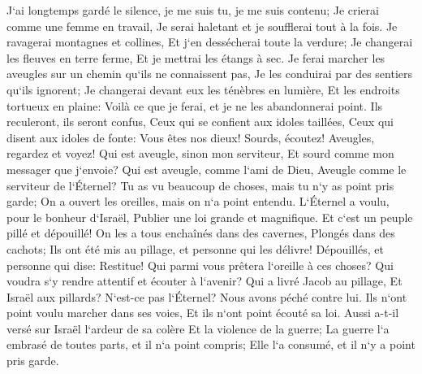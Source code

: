 \verse J`ai longtemps gardé le silence, je me suis tu, je me suis contenu; Je crierai comme une femme en travail, Je serai haletant et je soufflerai tout à la fois. 
\verse Je ravagerai montagnes et collines, Et j`en dessécherai toute la verdure; Je changerai les fleuves en terre ferme, Et je mettrai les étangs à sec. 
\verse Je ferai marcher les aveugles sur un chemin qu`ils ne connaissent pas, Je les conduirai par des sentiers qu`ils ignorent; Je changerai devant eux les ténèbres en lumière, Et les endroits tortueux en plaine: Voilà ce que je ferai, et je ne les abandonnerai point. 
\verse Ils reculeront, ils seront confus, Ceux qui se confient aux idoles taillées, Ceux qui disent aux idoles de fonte: Vous êtes nos dieux! 
\verse Sourds, écoutez! Aveugles, regardez et voyez! 
\verse Qui est aveugle, sinon mon serviteur, Et sourd comme mon messager que j`envoie? Qui est aveugle, comme l`ami de Dieu, Aveugle comme le serviteur de l`Éternel? 
\verse Tu as vu beaucoup de choses, mais tu n`y as point pris garde; On a ouvert les oreilles, mais on n`a point entendu. 
\verse L`Éternel a voulu, pour le bonheur d`Israël, Publier une loi grande et magnifique. 
\verse Et c`est un peuple pillé et dépouillé! On les a tous enchaînés dans des cavernes, Plongés dans des cachots; Ils ont été mis au pillage, et personne qui les délivre! Dépouillés, et personne qui dise: Restitue! 
\verse Qui parmi vous prêtera l`oreille à ces choses? Qui voudra s`y rendre attentif et écouter à l`avenir? 
\verse Qui a livré Jacob au pillage, Et Israël aux pillards? N`est-ce pas l`Éternel? Nous avons péché contre lui. Ils n`ont point voulu marcher dans ses voies, Et ils n`ont point écouté sa loi. 
\verse Aussi a-t-il versé sur Israël l`ardeur de sa colère Et la violence de la guerre; La guerre l`a embrasé de toutes parts, et il n`a point compris; Elle l`a consumé, et il n`y a point pris garde. 


